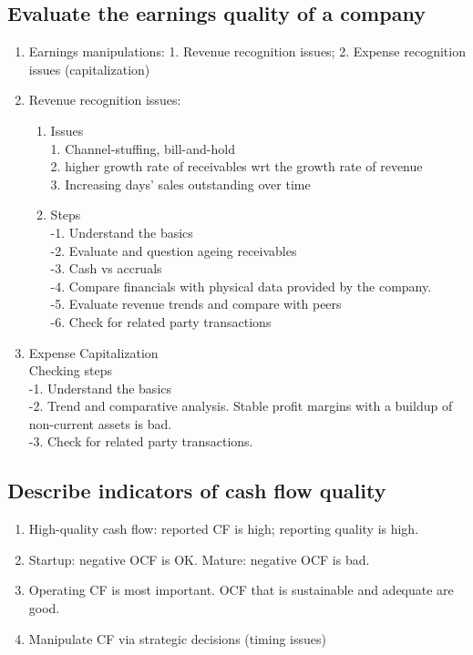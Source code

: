 \documentclass{article}
\newcommand{\be}{\begin{enumerate}}
\newcommand{\ee}{\end{enumerate}}
\begin{document}
\subsection{Evaluate the earnings quality of a company}
\be
    \item Earnings manipulations: 
        1. Revenue recognition issues; 
        2. Expense recognition issues (capitalization)
    \item Revenue recognition issues:
        \be
        \item Issues
        \\1. Channel-stuffing, bill-and-hold
        \\2. higher growth rate of receivables wrt the growth rate of revenue
        \\3. Increasing days' sales outstanding over time
        \item Steps
        \\-1. Understand the basics
        \\-2. Evaluate and question ageing receivables
        \\-3. Cash vs accruals
        \\-4. Compare financials with physical data provided by the company.
        \\-5. Evaluate revenue trends and compare with peers
        \\-6. Check for related party transactions
        \ee
    \item Expense Capitalization
        \\Checking steps
        \\-1. Understand the basics
        \\-2. Trend and comparative analysis. Stable profit margins with a buildup
        of non-current assets is bad.
        \\-3. Check for related party transactions.
\ee
\subsection{Describe indicators of cash flow quality}
\be
    \item High-quality cash flow: reported CF is high; reporting quality is high.
    \item Startup: negative OCF is OK. Mature: negative OCF is bad.
    \item Operating CF is most important. OCF that is sustainable and adequate are good.
    \item Manipulate CF via strategic decisions (timing issues)
\ee
\end{document}
